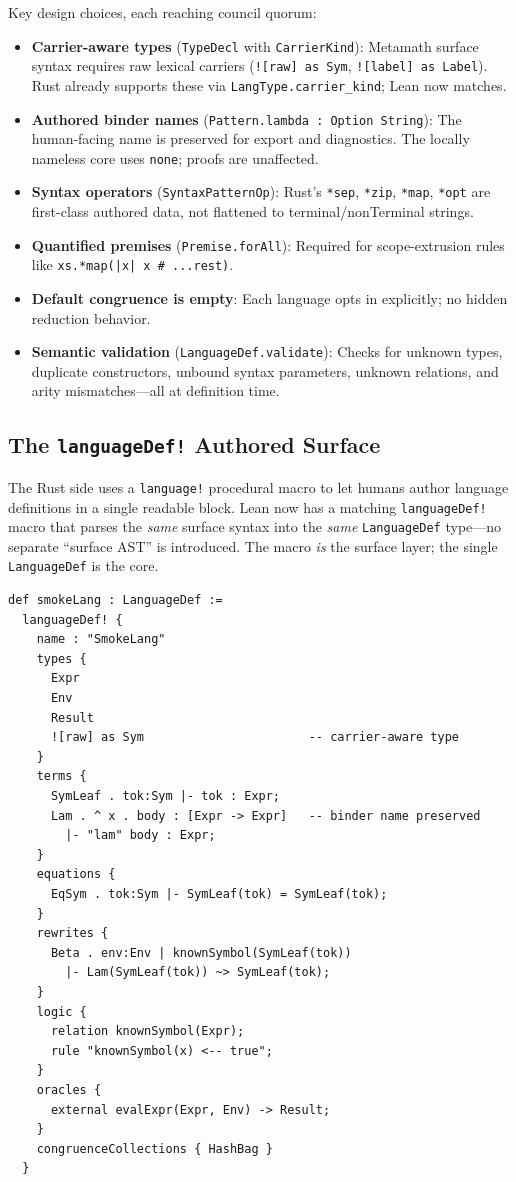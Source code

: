 \documentclass[11pt]{article}
\newcommand{\code}[1]{\texttt{#1}}
\newcommand{\codepath}[1]{\path{#1}}
\begin{document}
Key design choices, each reaching council quorum:
\begin{itemize}
\item \textbf{Carrier-aware types} (\code{TypeDecl} with \code{CarrierKind}):
  Metamath surface syntax requires raw lexical carriers (\code{![raw] as Sym},
  \code{![label] as Label}). Rust already supports these via
  \code{LangType.carrier\_kind}; Lean now matches.
\item \textbf{Authored binder names} (\code{Pattern.lambda : Option String}):
  The human-facing name is preserved for export and diagnostics.
  The locally nameless core uses \code{none}; proofs are unaffected.
\item \textbf{Syntax operators} (\code{SyntaxPatternOp}):
  Rust's \code{*sep}, \code{*zip}, \code{*map}, \code{*opt} are first-class
  authored data, not flattened to terminal/nonTerminal strings.
\item \textbf{Quantified premises} (\code{Premise.forAll}):
  Required for scope-extrusion rules like
  \code{xs.*map(|x| x \# ...rest)}.
\item \textbf{Default congruence is empty}:
  Each language opts in explicitly; no hidden reduction behavior.
\item \textbf{Semantic validation} (\code{LanguageDef.validate}):
  Checks for unknown types, duplicate constructors, unbound syntax parameters,
  unknown relations, and arity mismatches---all at definition time.
\end{itemize}

\subsection{The \code{languageDef!} Authored Surface}

The Rust side uses a \code{language!} procedural macro to let humans author
language definitions in a single readable block.  Lean now has a matching
\code{languageDef!} macro that parses the \emph{same} surface syntax into the
\emph{same} \code{LanguageDef} type---no separate ``surface AST'' is introduced.
The macro \emph{is} the surface layer; the single \code{LanguageDef} is the
core.

\begin{lstlisting}[language={},caption={Lean \code{languageDef!} example
  (\codepath{LanguageDefDSLTests.lean})}]
def smokeLang : LanguageDef :=
  languageDef! {
    name : "SmokeLang"
    types {
      Expr
      Env
      Result
      ![raw] as Sym                       -- carrier-aware type
    }
    terms {
      SymLeaf . tok:Sym |- tok : Expr;
      Lam . ^ x . body : [Expr -> Expr]   -- binder name preserved
        |- "lam" body : Expr;
    }
    equations {
      EqSym . tok:Sym |- SymLeaf(tok) = SymLeaf(tok);
    }
    rewrites {
      Beta . env:Env | knownSymbol(SymLeaf(tok))
        |- Lam(SymLeaf(tok)) ~> SymLeaf(tok);
    }
    logic {
      relation knownSymbol(Expr);
      rule "knownSymbol(x) <-- true";
    }
    oracles {
      external evalExpr(Expr, Env) -> Result;
    }
    congruenceCollections { HashBag }
  }
\end{lstlisting}
\end{document}
